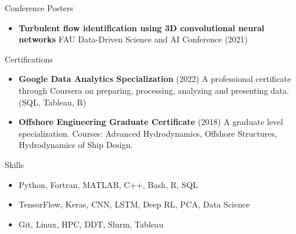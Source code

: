 \documentclass[]{mcdowellcv}
\begin{document}
		\begin{cvsubsection}{Conference Posters}{}{}
			\begin{itemize}
				\item  \textbf{Turbulent flow identification using 3D convolutional neural networks} FAU Data-Driven Science and AI Conference (2021)
			\end{itemize}
		\end{cvsubsection}
	
	\begin{cvsection}{Certifications}
		\begin{cvsubsection}{}{}{}	
			\begin{itemize}
				\item \textbf{Google Data Analytics Specialization} (2022) A professional certificate through Coursera on preparing, processing, analyzing and presenting data. (SQL, Tableau, R)
				\item \textbf{Offshore Engineering Graduate Certificate} (2018) A graduate level specialization. Courses: Advanced Hydrodynamics, Offshore Structures, Hydrodynamics of Ship Design.
			\end{itemize}
		\end{cvsubsection}
	\end{cvsection}
	
		\begin{cvsection}{Skills}
		\begin{cvsubsection}{}{}{}	
			\begin{itemize}
				\item Python, Fortran, MATLAB, C++, Bash, R, SQL
				\item TensorFlow, Keras, CNN, LSTM, Deep RL, PCA, Data Science
				\item Git, Linux, HPC, DDT, Slurm, Tableau
			\end{itemize}
		\end{cvsubsection}
	\end{cvsection}
	
	
\end{document}
